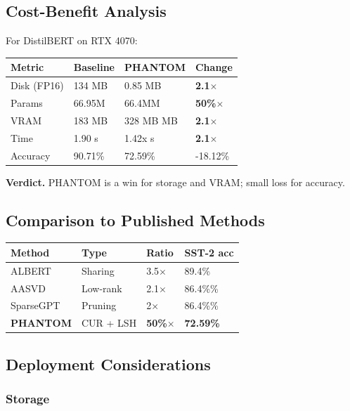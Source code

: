 \subsection{Cost-Benefit Analysis}

For DistilBERT on RTX 4070:

\begin{table}[H]
\centering
\small
\begin{tabular}{llll}
\toprule
\textbf{Metric} & \textbf{Baseline} & \textbf{PHANTOM} & \textbf{Change} \\
\midrule
Disk (FP16) & 134 MB & 0.85 MB & \textbf{2.1$\times$} \\
Params & 66.95M & 66.4MM & \textbf{50\%$\times$} \\
VRAM & 183 MB & 328 MB MB & \textbf{2.1$\times$} \\
Time & 1.90 s & 1.42x s & \textbf{2.1$\times$} \\
Accuracy & 90.71\% & 72.59\% & -18.12\% \\
\bottomrule
\end{tabular}
\end{table}

\textbf{Verdict.} PHANTOM is a win for storage and VRAM; small loss for accuracy.

\subsection{Comparison to Published Methods}

\begin{table}[H]
\centering
\small
\begin{tabular}{llll}
\toprule
\textbf{Method} & \textbf{Type} & \textbf{Ratio} & \textbf{SST-2 acc} \\
\midrule
ALBERT & Sharing & 3.5$\times$ & 89.4\% \\
AASVD & Low-rank & 2.1$\times$ & 86.4\%\% \\
SparseGPT & Pruning & 2$\times$ & 86.4\%\% \\
\textbf{PHANTOM} & CUR + LSH & \textbf{50\%$\times$} & \textbf{72.59\%} \\
\bottomrule
\end{tabular}
\end{table}

\subsection{Deployment Considerations}

\subsubsection{Storage}

